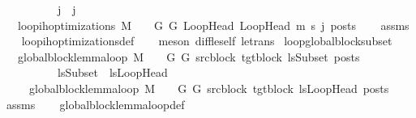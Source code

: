 \begin{isabellebody}
\ \ \ \ \ \ \ \ \ \ {\isachardoublequoteopen}j{\isacharprime}{\kern0pt}\ {\isasymle}\ j{\isachardoublequoteclose}\isanewline
\ \ \ {\isachardoublequoteopen}loop{\isacharunderscore}{\kern0pt}ih{\isacharunderscore}{\kern0pt}optimizations\ M\ {\isasymLambda}\ {\isasymGamma}\ {\isasymOmega}\ G\ G{\isacharprime}{\kern0pt}\ LoopHead\ LoopHead{\isacharprime}{\kern0pt}\ m{\isacharprime}{\kern0pt}\ s{\isacharprime}{\kern0pt}\ j{\isacharprime}{\kern0pt}\ posts{\isachardoublequoteclose}\isanewline
%
\isadelimproof
\ \ %
\endisadelimproof
%
\isatagproof
{}\isamarkupfalse%
\ assms\isanewline
\ \ \isamarkupfalse%
\ loop{\isacharunderscore}{\kern0pt}ih{\isacharunderscore}{\kern0pt}optimizations{\isacharunderscore}{\kern0pt}def\isanewline
\ \ \isamarkupfalse%
\ {\isacharparenleft}{\kern0pt}meson\ diff{\isacharunderscore}{\kern0pt}le{\isacharunderscore}{\kern0pt}self\ le{\isacharunderscore}{\kern0pt}trans{\isacharparenright}{\kern0pt}%
\endisatagproof
{\isafoldproof}%
%
\isadelimproof
\isanewline
%
\endisadelimproof
\isanewline
\isanewline
{}\isamarkupfalse%
\ loop{\isacharunderscore}{\kern0pt}global{\isacharunderscore}{\kern0pt}block{\isacharunderscore}{\kern0pt}subset{\isacharcolon}{\kern0pt}\ \isanewline
\ \ \ {\isachardoublequoteopen}global{\isacharunderscore}{\kern0pt}block{\isacharunderscore}{\kern0pt}lemma{\isacharunderscore}{\kern0pt}loop\ M\ {\isasymLambda}\ {\isasymGamma}\ {\isasymOmega}\ G\ G{\isacharprime}{\kern0pt}\ src{\isacharunderscore}{\kern0pt}block\ tgt{\isacharunderscore}{\kern0pt}block\ lsSubset\ posts{\isachardoublequoteclose}\isanewline
\ \ \ \ \ \ \ \ \ \ {\isachardoublequoteopen}{\isacharparenleft}{\kern0pt}lsSubset{\isacharparenright}{\kern0pt}\ {\isasymsubseteq}\ {\isacharparenleft}{\kern0pt}lsLoopHead{\isacharparenright}{\kern0pt}{\isachardoublequoteclose}\isanewline
\ \ \ \ \ {\isachardoublequoteopen}global{\isacharunderscore}{\kern0pt}block{\isacharunderscore}{\kern0pt}lemma{\isacharunderscore}{\kern0pt}loop\ M\ {\isasymLambda}\ {\isasymGamma}\ {\isasymOmega}\ G\ G{\isacharprime}{\kern0pt}\ src{\isacharunderscore}{\kern0pt}block\ tgt{\isacharunderscore}{\kern0pt}block\ lsLoopHead\ posts{\isachardoublequoteclose}\isanewline
%
\isadelimproof
\ \ %
\endisadelimproof
%
\isatagproof
{}\isamarkupfalse%
\ assms\isanewline
\ \ \isamarkupfalse%
\ global{\isacharunderscore}{\kern0pt}block{\isacharunderscore}{\kern0pt}lemma{\isacharunderscore}{\kern0pt}loop{\isacharunderscore}{\kern0pt}def\isanewline

\end{isabellebody}
